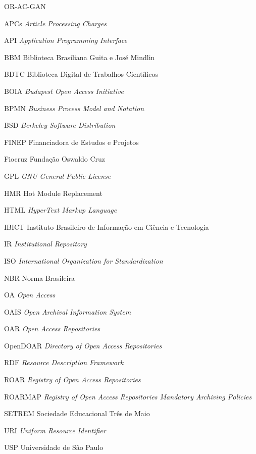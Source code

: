 \documentclass[diss]{template/setrem}
\begin{document}
\begin{listofabbrv}{OR-AC-GAN} %
    \item[APCs] {\emph{Article Processing Charges}}
    \item[API] {\emph{Application Programming Interface}}
    \item[BBM] {Biblioteca Brasiliana Guita e José Mindlin}
    \item[BDTC] {Biblioteca Digital de Trabalhos Científicos}
    \item[BOIA] {\emph{Budapest Open Access Initiative}}
    \item[BPMN] {\emph{Business Process Model and Notation}}
    \item[BSD] {\emph{Berkeley Software Distribution}}
    \item[FINEP] {Financiadora de Estudos e Projetos}
    \item[Fiocruz] {Fundação Oswaldo Cruz}
    \item[GPL] {\emph{GNU General Public License}}
    \item[HMR] {Hot Module Replacement}
    \item[HTML] {\emph{HyperText Markup Language}}
    \item[IBICT] {Instituto Brasileiro de Informação em Ciência e Tecnologia}
    \item[IR] {\emph{Institutional Repository}}
    \item[ISO] {\emph{International Organization for Standardization}}
    \item[NBR] {Norma Brasileira}
    \item[OA] {\emph{Open Access}}
    \item[OAIS] {\emph{Open Archival Information System}}
    \item[OAR] {\emph{Open Access Repositories}}
    \item[OpenDOAR] {\emph{Directory of Open Access Repositories}}
    \item[RDF] {\emph{Resource Description Framework }}
    \item[ROAR] {\emph{Registry of Open Access Repositories}}
    \item[ROARMAP] {\emph{Registry of Open Access Repositories Mandatory Archiving Policies}}
    \item[SETREM] {Sociedade Educacional Três de Maio}
    \item[URI] {\emph{Uniform Resource Identifier}}
    \item[USP] {Universidade de São Paulo}
\end{listofabbrv}

% 
\tableofcontents

\pagestyle{empty}
{
    
}






%




\end{document}

